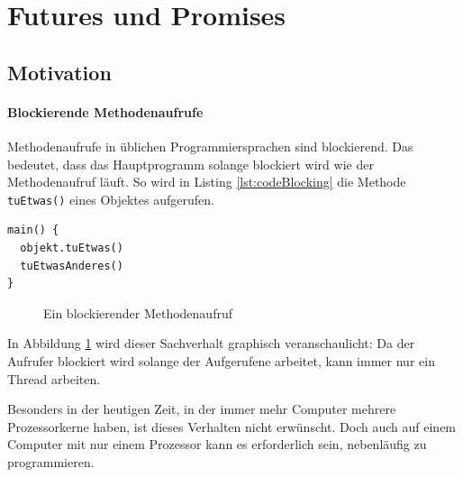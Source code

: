 \section{Futures und Promises}

\subsection{Motivation}

\paragraph{Blockierende Methodenaufrufe} Methodenaufrufe in üblichen Programmiersprachen sind blockierend. Das bedeutet,
dass das Hauptprogramm solange blockiert wird wie der Methodenaufruf läuft.
So wird in Listing \ref{lst:codeBlocking} die Methode \texttt{tuEtwas()} eines Objektes aufgerufen.

\begin{lstlisting}[caption={Blockierender Methodenaufruf},label={lst:codeBlocking},captionpos=b]
main() {
  objekt.tuEtwas()
  tuEtwasAnderes()
}
\end{lstlisting}

\begin{figure}[htbp]
  \centering
  \caption{Ein blockierender Methodenaufruf }
  \label{blockingCall}
\end{figure}

In Abbildung \ref{blockingCall} wird dieser Sachverhalt graphisch
veranschaulicht: Da der Aufrufer blockiert wird solange der Aufgerufene
arbeitet, kann immer nur ein Thread arbeiten.

Besonders in der heutigen Zeit, in der immer mehr Computer mehrere
Prozessorkerne haben, ist dieses Verhalten nicht erwünscht. Doch auch
auf einem Computer mit nur einem Prozessor kann es erforderlich sein,
nebenläufig zu programmieren.

